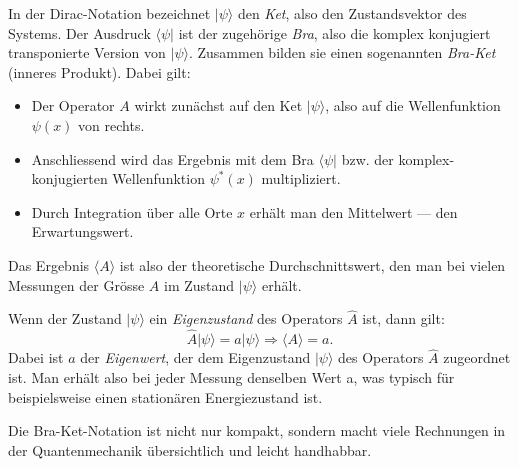 		In der Dirac-Notation bezeichnet $|\psi\rangle$ den \emph{Ket}, also den Zustandsvektor des Systems.
		Der Ausdruck $\langle \psi |$ ist der zugehörige \emph{Bra}, also die komplex konjugiert transponierte Version von $|\psi\rangle$.
		Zusammen bilden sie einen sogenannten \emph{Bra-Ket} (inneres Produkt).
		Dabei gilt:
		\begin{itemize}
			\item Der Operator $A$ wirkt zunächst auf den Ket $|\psi\rangle$, also auf die Wellenfunktion $\psi(x)$ von rechts.
			\item Anschliessend wird das Ergebnis mit dem Bra $\langle \psi|$ bzw. der komplex-konjugierten Wellenfunktion $\psi^*(x)$ multipliziert.
			\item Durch Integration über alle Orte $x$ erhält man den Mittelwert --- den Erwartungswert.
		\end{itemize}
		Das Ergebnis $\langle A \rangle$ ist also der theoretische Durchschnittswert, den man bei vielen Messungen der Grösse $A$ im Zustand $|\psi\rangle$ erhält.

		Wenn der Zustand $|\psi\rangle$ ein \emph{Eigenzustand} des Operators $\hat{A}$ ist, dann gilt:
		\begin{equation}
			\hat{A} | \psi \rangle = a | \psi \rangle \Rightarrow \langle A \rangle = a.
		\end{equation}
		Dabei ist $a$ der \emph{Eigenwert}, der dem Eigenzustand $|\psi\rangle$ des Operators $\hat{A}$ zugeordnet ist. 
		Man erhält also bei jeder Messung denselben Wert a, was typisch für beispielsweise einen stationären Energiezustand ist.

		Die Bra-Ket-Notation ist nicht nur kompakt, sondern macht viele Rechnungen in der Quantenmechanik übersichtlich und leicht handhabbar.

